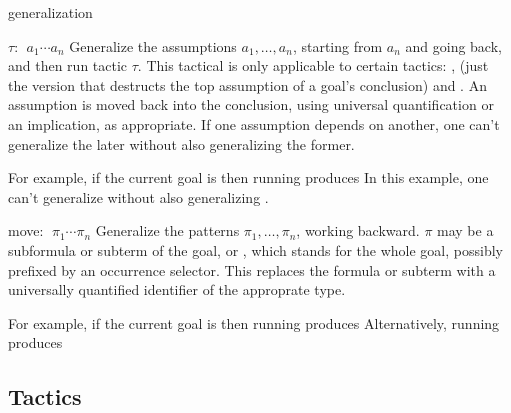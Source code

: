 \begin{tactic}{generalization}
  \begin{tsyntax}{$\tau$: $\;a_1 \cdots a_n$}
    Generalize the assumptions $a_1, \ldots, a_n$, starting from
    $a_n$ and going back, and then run tactic $\tau$.  This tactical
    is only applicable to certain tactics: ,
     (just the version that destructs the top assumption
    of a goal's conclusion) and .  An assumption is
    moved back into the conclusion, using universal quantification or
    an implication, as appropriate. If one assumption depends on
    another, one can't generalize the later without also generalizing
    the former.

    For example, if the current goal is
     then
    running 
    produces
     In
    this example, one can't generalize  without also
    generalizing .
  \end{tsyntax}

  \begin{tsyntax}{move: $\;\pi_1 \cdots \pi_n$}
    Generalize the patterns $\pi_1, \ldots, \pi_n$, working backward.
    $\pi$ may be a subformula or subterm of the goal, or \ec{_}, which
    stands for the whole goal, possibly prefixed by an occurrence
    selector. This replaces the formula or subterm with a universally
    quantified identifier of the approprate type.

    For example, if the current goal is
     then
    running 
    produces
    Alternatively, running
    produces
  \end{tsyntax}
\end{tactic}

\subsection{Tactics}












